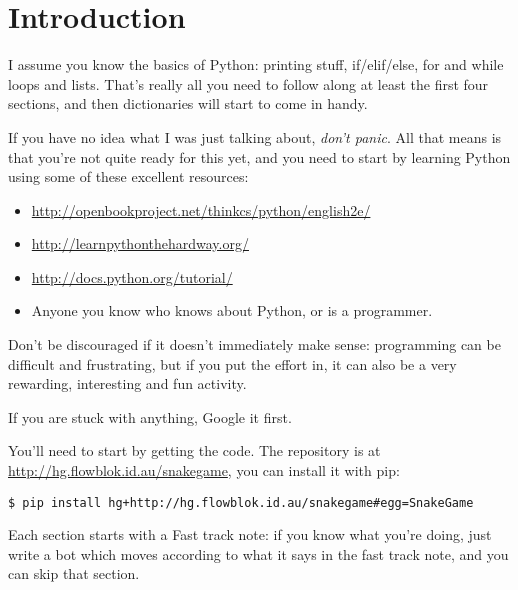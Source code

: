 \section{Introduction}

I assume you know the basics of Python:
printing stuff,
if/elif/else,
for and while loops and lists.
That’s really all you need to follow along at least the first four sections,
and then dictionaries will start to come in handy.

If you have no idea what I was just talking about, \emph{don’t panic}.
All that means is that you’re not quite ready for this yet,
and you need to start by learning Python using some of these excellent
resources:
\begin{itemize}
    \item \url{http://openbookproject.net/thinkcs/python/english2e/}
    \item \url{http://learnpythonthehardway.org/}
    \item \url{http://docs.python.org/tutorial/}
    \item Anyone you know who knows about Python, or is a programmer.
\end{itemize}
Don’t be discouraged if it doesn’t immediately make sense:
programming can be difficult and frustrating,
but if you put the effort in, it can also be a very rewarding, interesting and
fun activity.

If you are stuck with anything, Google it first.

You’ll need to start by getting the code.
The repository is at
\url{http://hg.flowblok.id.au/snakegame},
you can install it with pip:
\begin{verbatim}
$ pip install hg+http://hg.flowblok.id.au/snakegame#egg=SnakeGame
\end{verbatim}

Each section starts with a Fast track note:
if you know what you’re doing, just write a bot which moves according to what it
says in the fast track note, and you can skip that section.
